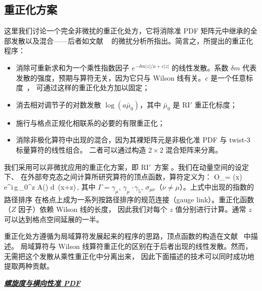 \vspace*{0.25cm}
\subsection{重正化方案}
\label{sec:scheme}
\vspace*{0.15cm}

这里我们讨论一个完全非微扰的重正化处方，它将消除准 PDF 矩阵元中继承的全部发散以及混合——后者如文献
~\cite{Constantinou:2017sej} 的微扰分析所指出。简言之，所提出的重正化程序：
\begin{itemize}
\item[\bf 1] 消除可重新求和为一个乘性指数因子 $e^{-\delta m |z|/a + c |z|}$ 的线性发散。系数 $\delta m$
代表发散的强度，预期与算符无关，因为它只与 Wilson 线有关。$c$ 是一个任意标度~\cite{Sommer:2015hea}，
可通过这样的重正化处方加以固定；
\item[\bf 2] 消去相对调节子的对数发散 $\log(a\bar\mu_0)$，其中 $\bar\mu_0$ 是 RI$'$ 重正化标度；
\item[\bf 3] 施行与格点正规化相联系的必要的有限重正化；
\item[\bf 4] 消除非极化算符中出现的混合，因为其裸矩阵元是非极化准 PDF 与 twist-3 标量算符的线性组合。
二者可以通过构造 $2{\times}2$ 混合矩阵来分离。
\end{itemize}

\medskip
我们采用可以非微扰应用的重正化方案，即 RI$'$~方案 \cite{Martinelli:1994ty}。我们在动量空间的设定下、
在外部夸克态之间计算所研究算符的顶点函数，算符定义为：
\be
{\cal O}_\Gamma = \overline \psi(x) \, \Gamma \,\, e^{i\,g\,\int_{0}^{z} A(\zeta) d\zeta}\, \psi(x+z\hat{\mu})\,,
\ee
其中 $\Gamma=\gamma_\mu,\,\gamma_\mu\cdot\gamma_5,\,\sigma_{\mu\nu}$（$\nu\neq\mu$）。上式中出现的指数的路径排序
在格点上成为一系列按路径排序的规范连接（gauge link）。重正化函数（$Z$ 因子）依赖 Wilson 线的长度，
因此我们对每个 $z$ 值分别进行计算。通常 $z$ 可以达到格点空间延展的一半。

\medskip
重正化处方遵循为局域算符发展起来的程序的思路，顶点函数的构造在文献~\cite{Alexandrou:2010me} 中描述。
局域算符与 Wilson 线算符重正化的区别在于后者出现的线性发散。然而，无需把这个发散从乘性重正化中分离出来，
因此下面描述的技术可以同时成功地提取两种贡献。

\vspace*{0.55cm}
\centerline{\bf\underline{\textit{螺旋度与横向性准 PDF}}}
\vskip 0.25cm


